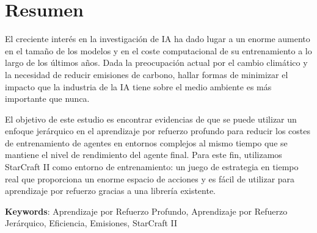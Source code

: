 \chapter*{Resumen}

El creciente interés en la investigación de IA ha dado lugar a un enorme aumento en el tamaño de los modelos y en el coste computacional de su entrenamiento a lo largo de los últimos años. Dada la preocupación actual por el cambio climático y la necesidad de reducir emisiones de carbono, hallar formas de minimizar el impacto que la industria de la IA tiene sobre el medio ambiente es más importante que nunca.

El objetivo de este estudio es encontrar evidencias de que se puede utilizar un enfoque jerárquico en el aprendizaje por refuerzo profundo para reducir los costes de entrenamiento de agentes en entornos complejos al mismo tiempo que se mantiene el nivel de rendimiento del agente final. Para este fin, utilizamos StarCraft II como entorno de entrenamiento: un juego de estrategia en tiempo real que proporciona un enorme espacio de acciones y es fácil de utilizar para aprendizaje por refuerzo gracias a una librería existente.

\vspace{1.5cm}

\textbf{Keywords}: Aprendizaje por Refuerzo Profundo, Aprendizaje por Refuerzo Jerárquico, Eficiencia, Emisiones, StarCraft II